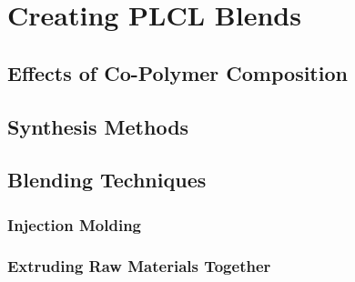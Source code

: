 \section{Creating PLCL Blends\label{sec:literatureReview:PLCL}}

\subsection{Effects of Co-Polymer Composition\label{sec:literatureReview:PLCL:composition}}

\subsection{Synthesis Methods\label{sec:literatureReview:PLCL:synthesis}}

\subsection{Blending Techniques\label{sec:literatureReview:PLCL:blending}}

\subsubsection{Injection Molding\label{sec:literatureReview:PLCL:blending:injectionMolding}}

\subsubsection{Extruding Raw Materials Together\label{sec:literatureReview:PLCL:blending:coextrusion}}
